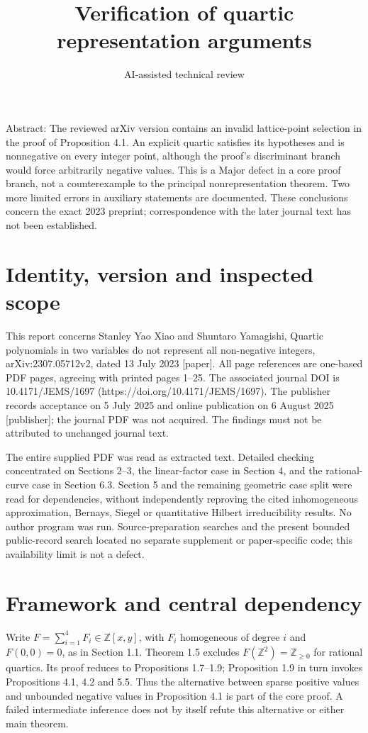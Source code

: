 \documentclass[10pt]{article}
\title{Verification of quartic representation arguments}
\author{AI-assisted technical review}
\date{}
\begin{document}
\maketitle
Abstract: The reviewed arXiv version contains an invalid lattice-point selection in the proof of Proposition 4.1. An explicit quartic satisfies its hypotheses and is nonnegative on every integer point, although the proof’s discriminant branch would force arbitrarily negative values. This is a Major defect in a core proof branch, not a counterexample to the principal nonrepresentation theorem. Two more limited errors in auxiliary statements are documented. These conclusions concern the exact 2023 preprint; correspondence with the later journal text has not been established.\par
\section*{Identity, version and inspected scope}
This report concerns Stanley Yao Xiao and Shuntaro Yamagishi, Quartic polynomials in two variables do not represent all non-negative integers, arXiv:2307.05712v2, dated 13 July 2023 [paper]. All page references are one-based PDF pages, agreeing with printed pages 1–25. The associated journal DOI is 10.4171/JEMS/1697 (https://doi.org/10.4171/JEMS/1697). The publisher records acceptance on 5 July 2025 and online publication on 6 August 2025 [publisher]; the journal PDF was not acquired. The findings must not be attributed to unchanged journal text.\par
The entire supplied PDF was read as extracted text. Detailed checking concentrated on Sections 2–3, the linear-factor case in Section 4, and the rational-curve case in Section 6.3. Section 5 and the remaining geometric case split were read for dependencies, without independently reproving the cited inhomogeneous approximation, Bernays, Siegel or quantitative Hilbert irreducibility results. No author program was run. Source-preparation searches and the present bounded public-record search located no separate supplement or paper-specific code; this availability limit is not a defect.\par
\section*{Framework and central dependency}
Write \(F=\sum_{i=1}^{4}F_i\in\mathbb Z[x,y]\), with \(F_i\) homogeneous of degree \(i\) and \(F(0,0)=0\), as in Section 1.1. Theorem 1.5 excludes \(F(\mathbb Z^2)=\mathbb Z_{\geq0}\) for rational quartics. Its proof reduces to Propositions 1.7–1.9; Proposition 1.9 in turn invokes Propositions 4.1, 4.2 and 5.5. Thus the alternative between sparse positive values and unbounded negative values in Proposition 4.1 is part of the core proof. A failed intermediate inference does not by itself refute this alternative or either main theorem.\par
\end{document}
